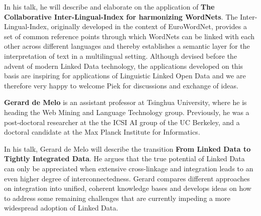 In his talk, he will describe and elaborate on the application of \textbf{The Collaborative Inter-Lingual-Index for harmonizing WordNets}. 
The Inter-Lingual-Index, originally developed in the context of EuroWordNet, provides a set of common reference points through which WordNets can be linked with each other across different languages and thereby establishes a semantic layer for the interpretation of text in a multilingual setting. Although devised before the advent of modern Linked Data technology, the applications developed on this basis are inspiring for applications of Linguistic Linked Open Data and we are therefore very happy to welcome Piek for discussions and exchange of ideas.


\smallskip

\textbf{Gerard de Melo} is an assistant professor at Tsinghua
 University, where he is heading the Web Mining and Language Technology
 group. Previously, he was a post-doctoral researcher at the the ICSI AI group of the UC Berkeley, and a doctoral candidate at the Max Planck
 Institute for Informatics.

In his talk, Gerard de Melo will describe the transition \textbf{From Linked Data to Tightly Integrated Data}. 
He argues that the true potential of Linked Data can only be appreciated when extensive cross-linkage and integration leads to an even higher degree of interconnectedness. Gerard compares different approaches on integration into unified, coherent knowledge bases and develops ideas on how to address some remaining challenges that are currently
 impeding a more widespread adoption of Linked Data. 

